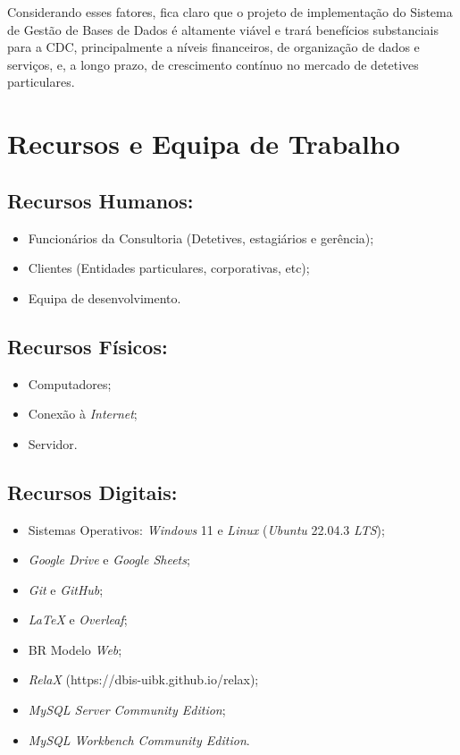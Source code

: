 \documentclass[a4paper,12pt]{scrreprt}
\begin{document}
        Considerando esses fatores, fica claro que o projeto de implementação do Sistema de Gestão de Bases de Dados é
        altamente viável e trará benefícios substanciais para a CDC, principalmente a níveis financeiros, de
        organização de dados e serviços, e, a longo prazo, de crescimento contínuo no mercado de detetives particulares.

    \clearpage
    
    \section{Recursos e Equipa de Trabalho}
        \subsection{Recursos Humanos:}
            \begin{itemize}
                \item Funcionários da Consultoria (Detetives, estagiários e gerência);
                \item Clientes (Entidades particulares, corporativas, etc);
                \item Equipa de desenvolvimento.
            \end{itemize}
        \subsection{Recursos Físicos:}
            \begin{itemize}
                \item Computadores;
                \item Conexão à \textit{Internet};
                \item Servidor.
            \end{itemize}
        \subsection{Recursos Digitais:}
            \begin{itemize}
                \item Sistemas Operativos: \textit{Windows} 11 e \textit{Linux} (\textit{Ubuntu} 22.04.3 \textit{LTS});
                \item \textit{Google Drive} e \textit{Google Sheets};
                \item \textit{Git} e \textit{GitHub};
                \item \textit{LaTeX} e \textit{Overleaf};
                \item BR Modelo \textit{Web};
                \item \textit{RelaX} (https://dbis-uibk.github.io/relax);
                \item \textit{MySQL Server Community Edition};
                \item \textit{MySQL Workbench Community Edition}.
            \end{itemize}
\end{document}

